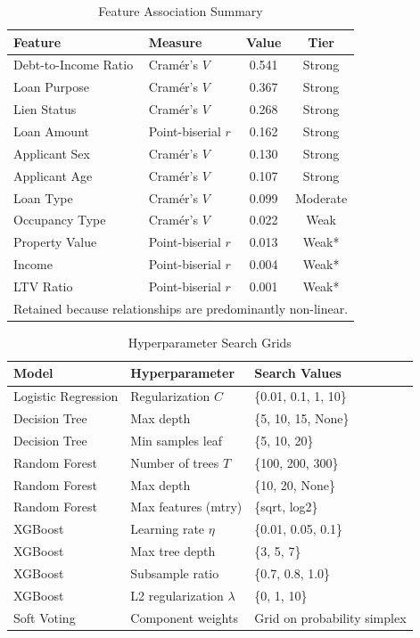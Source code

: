 \documentclass[12pt,letterpaper]{article}
\begin{document}
\begin{table}[H]
\centering
\caption{Feature Association Summary}
\label{tab:features}
\begin{tabular}{llcc}
\toprule
\textbf{Feature} & \textbf{Measure} & \textbf{Value} & \textbf{Tier} \\
\midrule
Debt-to-Income Ratio  & Cram\'{e}r's $V$ & 0.541 & Strong \\
Loan Purpose          & Cram\'{e}r's $V$ & 0.367 & Strong \\
Lien Status           & Cram\'{e}r's $V$ & 0.268 & Strong \\
Loan Amount           & Point-biserial $r$ & 0.162 & Strong \\
Applicant Sex         & Cram\'{e}r's $V$ & 0.130 & Strong \\
Applicant Age         & Cram\'{e}r's $V$ & 0.107 & Strong \\
Loan Type             & Cram\'{e}r's $V$ & 0.099 & Moderate \\
Occupancy Type        & Cram\'{e}r's $V$ & 0.022 & Weak \\
Property Value        & Point-biserial $r$ & 0.013 & Weak* \\
Income                & Point-biserial $r$ & 0.004 & Weak* \\
LTV Ratio             & Point-biserial $r$ & 0.001 & Weak* \\
\bottomrule
\multicolumn{4}{l}{\small *Retained because relationships are predominantly non-linear.}
\end{tabular}
\end{table}

\begin{table}[H]
\centering
\caption{Hyperparameter Search Grids}
\label{tab:hyperparams}
\begin{tabular}{lll}
\toprule
\textbf{Model} & \textbf{Hyperparameter} & \textbf{Search Values} \\
\midrule
Logistic Regression & Regularization $C$     & \{0.01, 0.1, 1, 10\} \\
Decision Tree       & Max depth               & \{5, 10, 15, None\} \\
Decision Tree       & Min samples leaf        & \{5, 10, 20\} \\
Random Forest       & Number of trees $T$     & \{100, 200, 300\} \\
Random Forest       & Max depth               & \{10, 20, None\} \\
Random Forest       & Max features (mtry)     & \{sqrt, log2\} \\
XGBoost             & Learning rate $\eta$    & \{0.01, 0.05, 0.1\} \\
XGBoost             & Max tree depth          & \{3, 5, 7\} \\
XGBoost             & Subsample ratio         & \{0.7, 0.8, 1.0\} \\
XGBoost             & L2 regularization $\lambda$ & \{0, 1, 10\} \\
Soft Voting         & Component weights       & Grid on probability simplex \\
\bottomrule
\end{tabular}
\end{table}
\end{document}
